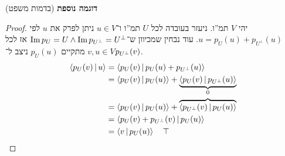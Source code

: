 \documentclass[name=רשימות אלגברה לינארית 2א]{../../../tex/classes/megasumPreamble}
\begin{document}
	\textbf{דוגמה נוספת} (בדמות משפט)
	\begin{proof}
		יהי $V$ תמ''ו. ניעזר בעובדה לכל $U$ תמ''ו ו־$u \in V$ ניתן לפרק את $u$ לפי $u = p_U(u) + p_{U^{\perp}}(u)$. עוד נבחין שמכיוון ש־$\operatorname{Im} p_U = U \land \operatorname{Im} p_{U^{\perp}} = U^{\perp}$ אז לכל $v, u \in V$ מתקיים $p_U(u)$ ניצב ל־$p_{U^{\perp}}(v)$. 
		\begin{align*}
			\left \langle p_U(v) \,\middle|\, u \right \rangle &= \left \langle p_U(v) \,\middle|\, p_U(u) + p_{U^{\perp}}(u) \right \rangle \\
			&= \left \langle p_U(v) \,\middle|\, p_U(u) \right \rangle + \underbrace{\left \langle p_U(v) \,\middle|\, p_{U^{\perp}}(u) \right \rangle}_{0} \\
			&= \left \langle p_U(v) \,\middle|\, p_U(u) \right \rangle + \overbrace{\left \langle p_{U^{\perp}}(v) \,\middle|\, p_{U}(u) \right \rangle} \\
			&= \left \langle p_U(v) + p_{U^{\perp}}(v) \,\middle|\, p_U(u) \right \rangle \\
			&= \left \langle v \,\middle|\, p_U(u) \right \rangle \quad \top
		\end{align*}\mathenvendproof
	\end{proof}
	
	
\end{document}
